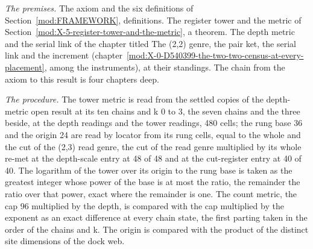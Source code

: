 \begin{chproof}
\textit{The premises.} The axiom and the six definitions of Section~\ref{mod:FRAMEWORK}, definitions. The register tower and the metric of Section~\ref{mod:X-5-register-tower-and-the-metric}, a theorem. The depth metric and the serial link of the chapter titled The (2,2) genre, the pair ket, the serial link and the increment (chapter~\ref{mod:X-0-D540399-the-two-two-census-at-every-placement}, among the instruments), at their standings. The chain from the axiom to this result is four chapters deep.

\textit{The procedure.} The tower metric is read from the settled copies of the depth-metric open result at its ten chains and k 0 to 3, the seven chains and the three beside, at the depth readings and the tower readings, 480 cells; the rung base 36 and the origin 24 are read by locator from its rung cells, equal to the whole and the cut of the (2,3) read genre, the cut of the read genre multiplied by its whole re-met at the depth-scale entry at 48 of 48 and at the cut-register entry at 40 of 40. The logarithm of the tower over its origin to the rung base is taken as the greatest integer whose power of the base is at most the ratio, the remainder the ratio over that power, exact where the remainder is one. The count metric, the cap 96 multiplied by the depth, is compared with the cap multiplied by the exponent as an exact difference at every chain state, the first parting taken in the order of the chains and k. The origin is compared with the product of the distinct site dimensions of the dock web.


\end{chproof}
